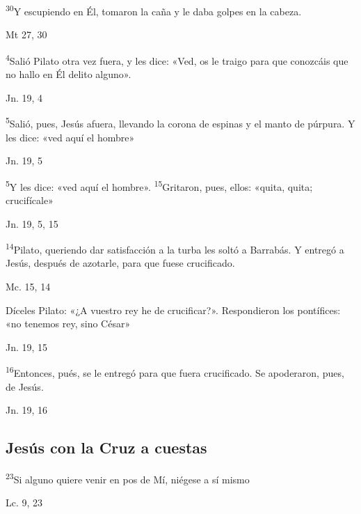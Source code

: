\documentclass[a4paper,11pt]{article}
\begin{document}
      \textsuperscript{30}Y escupiendo en Él, tomaron la caña y le daba golpes en la cabeza.
      \begin{flushright}
        Mt 27, 30
      \end{flushright}

      \textsuperscript{4}Salió Pilato otra vez fuera, y les dice: «Ved, os le traigo para que conozcáis que no hallo en Él delito alguno».
      \begin{flushright}
        Jn. 19, 4
      \end{flushright}

      \textsuperscript{5}Salió, pues, Jesús afuera, llevando la corona de espinas y el manto de púrpura. Y les dice: «ved aquí el hombre»
      \begin{flushright}
        Jn. 19, 5
      \end{flushright}

      \textsuperscript{5}Y les dice: «ved aquí el hombre». \textsuperscript{15}Gritaron, pues, ellos: «quita, quita; crucifícale»
      \begin{flushright}
        Jn. 19, 5, 15
      \end{flushright}

      \textsuperscript{14}Pilato, queriendo dar satisfacción a la turba les soltó a Barrabás. Y entregó a Jesús, después de azotarle, para que fuese crucificado.
      \begin{flushright}
        Mc. 15, 14
      \end{flushright}

      Díceles Pilato: «¿A vuestro rey he de crucificar?». Respondieron los pontífices: «no tenemos rey, sino César»
      \begin{flushright}
        Jn. 19, 15
      \end{flushright}

      \textsuperscript{16}Entonces, pués, se le entregó para que fuera crucificado. Se apoderaron, pues, de Jesús.
      \begin{flushright}
        Jn. 19, 16
      \end{flushright}

    \subsection*{\hfil Jesús con la Cruz a cuestas \hfil}
      
      \textsuperscript{23}Si alguno quiere venir en pos de Mí, niégese a sí mismo
      \begin{flushright}
        Lc. 9, 23
      \end{flushright}
\end{document}
